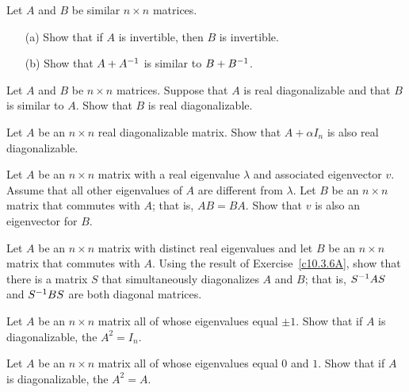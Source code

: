 \documentclass{ximera}
\begin{document}
\begin{exercise} \label{c10.3.4}
Let $A$ and $B$ be similar $n\times n$ matrices.
\begin{itemize}
\item[(a)]  Show that if $A$ is invertible, then $B$ is invertible.
\item[(b)]  Show that $A+A^{-1}$ is similar to $B+B^{-1}$.
\end{itemize}
\end{exercise}

\begin{exercise} \label{c10.3.5}
Let $A$ and $B$ be $n\times n$ matrices.  Suppose that $A$ is real 
diagonalizable and that $B$ is similar to $A$.  Show that $B$ is 
real diagonalizable.
\end{exercise}

\begin{exercise} \label{c10.3.6}
Let $A$ be an $n\times n$ real diagonalizable matrix. Show that $A+\alpha I_n$
is also real diagonalizable.
\end{exercise}

\begin{exercise} \label{c10.3.6A}
Let $A$ be an $n\times n$ matrix with a real eigenvalue $\lambda$ and 
associated eigenvector $v$.  Assume that all other eigenvalues of $A$ are
different from $\lambda$.  Let $B$ be an $n\times n$ matrix that commutes
with $A$; that is, $AB=BA$.  Show that $v$ is also an eigenvector for $B$.
\end{exercise}

\begin{exercise} \label{c10.3.6B}
Let $A$ be an $n\times n$ matrix with distinct real eigenvalues and let $B$ 
be an $n\times n$ matrix that commutes with $A$.  Using the result of
Exercise~\ref{c10.3.6A}, show that there is a matrix $S$ that simultaneously
diagonalizes $A$ and $B$; that is, $S^{-1} AS$ and $S^{-1} BS$ are both
diagonal matrices.
\end{exercise}

\begin{exercise} \label{c10.3.6C}
Let $A$ be an $n\times n$ matrix all of whose eigenvalues equal $\pm 1$. Show
that if $A$ is diagonalizable, the $A^2=I_n$.
\end{exercise}

\begin{exercise} \label{c10.3.6D}
Let $A$ be an $n\times n$ matrix all of whose eigenvalues equal $0$ and $1$. 
Show that if $A$ is diagonalizable, the $A^2=A$.
\end{exercise}
\end{document}
